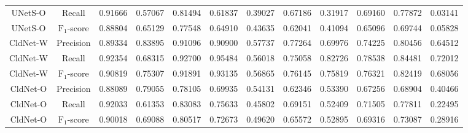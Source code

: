 \begin{table}[H]
{\begin{tabular}{cccccccccccc}
            UNetS-O    & Recall                 & 0.91666 & 0.57067 & 0.81494 & 0.61837 & 0.39027 & 0.67186 & 0.31917 & 0.69160 & 0.77872 & 0.03141 \\
            UNetS-O    & $\mathrm{F_{1}}$-score & 0.88804 & 0.65129 & 0.77548 & 0.64910 & 0.43635 & 0.62041 & 0.41094 & 0.65096 & 0.69744 & 0.05828 \\
            CldNet-W   & Precision              & 0.89334 & 0.83895 & 0.91096 & 0.90900 & 0.57737 & 0.77264 & 0.69976 & 0.74225 & 0.80456 & 0.64512 \\
            CldNet-W   & Recall                 & 0.92354 & 0.68315 & 0.92700 & 0.95484 & 0.56018 & 0.75058 & 0.82726 & 0.78538 & 0.84481 & 0.72012 \\
            CldNet-W   & $\mathrm{F_{1}}$-score & 0.90819 & 0.75307 & 0.91891 & 0.93135 & 0.56865 & 0.76145 & 0.75819 & 0.76321 & 0.82419 & 0.68056 \\
            CldNet-O   & Precision              & 0.88089 & 0.79055 & 0.78105 & 0.69935 & 0.54131 & 0.62346 & 0.53390 & 0.67256 & 0.68904 & 0.40466 \\
            CldNet-O   & Recall                 & 0.92033 & 0.61353 & 0.83083 & 0.75633 & 0.45802 & 0.69151 & 0.52409 & 0.71505 & 0.77811 & 0.22495 \\
            CldNet-O   & $\mathrm{F_{1}}$-score & 0.90018 & 0.69088 & 0.80517 & 0.72673 & 0.49620 & 0.65572 & 0.52895 & 0.69316 & 0.73087 & 0.28916 \\
            \hline
        \end{tabular}
    }
\end{table}